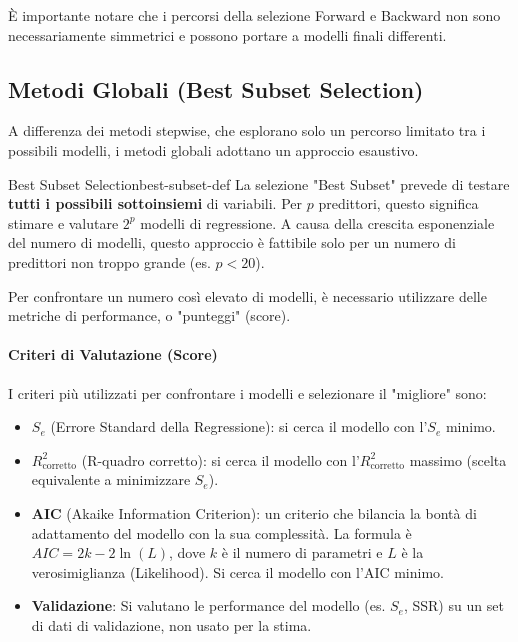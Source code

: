 È importante notare che i percorsi della selezione Forward e Backward non sono
necessariamente simmetrici e possono portare a modelli finali differenti.

\subsection{Metodi Globali (Best Subset Selection)}

A differenza dei metodi stepwise, che esplorano solo un percorso limitato tra i
possibili modelli, i metodi globali adottano un approccio esaustivo.

\begin{definizione}{Best Subset Selection}{best-subset-def}
La selezione "Best Subset" prevede di testare \textbf{tutti i possibili
sottoinsiemi} di variabili. Per \(p\) predittori, questo significa stimare e
valutare \(2^p\) modelli di regressione. A causa della crescita esponenziale del
numero di modelli, questo approccio è fattibile solo per un numero di
predittori non troppo grande (es. \(p < 20\)).
\end{definizione}

Per confrontare un numero così elevato di modelli, è necessario utilizzare
delle metriche di performance, o "punteggi" (score).

\paragraph{Criteri di Valutazione (Score)}
I criteri più utilizzati per confrontare i modelli e selezionare il "migliore"
sono:
\begin{itemize}
    \item \textbf{\(S_e\)} (Errore Standard della Regressione): si cerca il
    modello con l'\(S_e\) minimo.
    \item \textbf{\(R^2_{\text{corretto}}\)} (R-quadro corretto): si cerca il
    modello con l'\(R^2_{\text{corretto}}\) massimo (scelta equivalente a
    minimizzare \(S_e\)).
    \item \textbf{AIC} (Akaike Information Criterion): un criterio che bilancia
    la bontà di adattamento del modello con la sua complessità. La formula è
    \( AIC = 2k - 2\ln(L) \), dove \(k\) è il numero di parametri e \(L\) è la
    verosimiglianza (Likelihood). Si cerca il modello con l'AIC minimo.
    \item \textbf{Validazione}: Si valutano le performance del modello (es.
    \(S_e\), SSR) su un set di dati di validazione, non usato per la stima.
\end{itemize}

